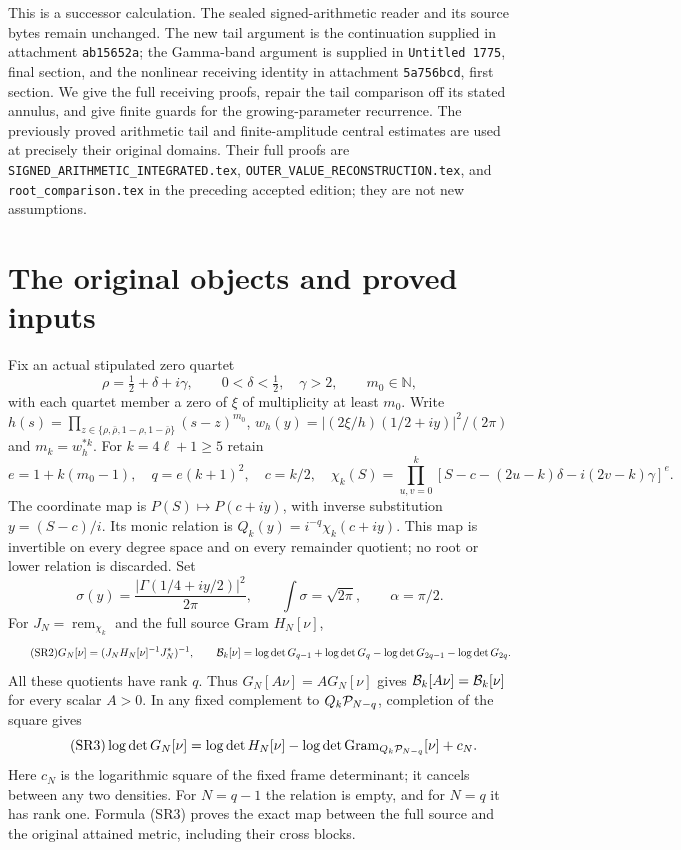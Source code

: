 \documentclass[11pt,a4paper]{article}
\begin{document}
\noindent This is a successor calculation. The sealed signed-arithmetic reader and
its source bytes remain unchanged. The new tail argument is the continuation
supplied in attachment \texttt{ab15652a}; the Gamma-band argument is supplied in
\texttt{Untitled 1775}, final section, and the nonlinear receiving identity in
attachment \texttt{5a756bcd}, first section. We give the full receiving proofs,
repair the tail comparison off its stated annulus, and give finite guards for
the growing-parameter recurrence. The previously proved arithmetic tail and
finite-amplitude central estimates are used at precisely their original domains.
Their full proofs are \texttt{SIGNED\_ARITHMETIC\_INTEGRATED.tex},
\texttt{OUTER\_VALUE\_RECONSTRUCTION.tex}, and \texttt{root\_comparison.tex}
in the preceding accepted edition; they are not new assumptions.

\section{The original objects and proved inputs}
Fix an actual stipulated zero quartet
\[
 \rho=\tfrac12+\delta+i\gamma,\qquad 0<\delta<\tfrac12,\quad\gamma>2,
 \qquad m_0\in\mathbb N,
\]
with each quartet member a zero of $\xi$ of multiplicity at least $m_0$.
Write $h(s)=\prod_{z\in\{\rho,\bar\rho,1-\rho,1-\bar\rho\}}(s-z)^{m_0}$,
$w_h(y)=|(2\xi/h)(1/2+iy)|^2/(2\pi)$ and $m_k=w_h^{*k}$.
For $k=4\ell+1\ge5$ retain
\begin{equation}\tag{SR1}
 e=1+k(m_0-1),\quad q=e(k+1)^2,\quad c=k/2,\quad
 \chi_k(S)=\prod_{u,v=0}^k
 [S-c-(2u-k)\delta-i(2v-k)\gamma]^e.
\end{equation}
The coordinate map is $P(S)\mapsto P(c+iy)$, with inverse substitution
$y=(S-c)/i$. Its monic relation is $Q_k(y)=i^{-q}\chi_k(c+iy)$.
This map is invertible on every degree space and on every remainder quotient;
no root or lower relation is discarded. Set
\[
 \sigma(y)=\frac{|\Gamma(1/4+iy/2)|^2}{2\pi},\qquad
 \int\sigma=\sqrt{2\pi},\qquad \alpha=\pi/2.
\]
For $J_N=\operatorname{rem}_{\chi_k}$ and the full source Gram $H_N[\nu]$,
\begin{equation}\tag{SR2}
 G_N[\nu]=(J_NH_N[\nu]^{-1}J_N^*)^{-1},\qquad
 \mathcal B_k[\nu]=\log\det G_{q-1}+\log\det G_q
             -\log\det G_{2q-1}-\log\det G_{2q}.
\end{equation}
All these quotients have rank $q$. Thus $G_N[A\nu]=AG_N[\nu]$ gives
$\mathcal B_k[A\nu]=\mathcal B_k[\nu]$ for every scalar $A>0$.
In any fixed complement to $Q_k\mathcal P_{N-q}$, completion of the square gives
\begin{equation}\tag{SR3}
 \log\det G_N[\nu]=\log\det H_N[\nu]
 -\log\det\operatorname{Gram}_{Q_k\mathcal P_{N-q}}[\nu]+c_N.
\end{equation}
Here $c_N$ is the logarithmic square of the fixed frame determinant; it cancels
between any two densities. For $N=q-1$ the relation is empty, and for $N=q$ it
has rank one. Formula (SR3) proves the exact map between the full source and
the original attained metric, including their cross blocks.
\end{document}
